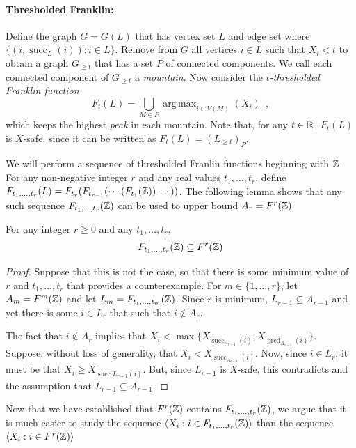 \documentclass{patmorin}
\DeclareMathOperator*{\argmax}{arg\,max}
\DeclareMathOperator{\cw}{succ}
\DeclareMathOperator{\ccw}{pred}
\begin{document}
\paragraph{Thresholded Franklin:}
Define the graph $G=G(L)$ that has vertex set $L$ and edge set where
$\{(i,\cw_L(i)): i\in L\}$. Remove from $G$ all vertices $i\in L$
such that $X_i < t$ to obtain a graph $G_{\ge t}$ that has a set $P$
of connected components.  We call each connected component of $G_{\ge
t}$ a \emph{mountain}.  Now consider the \emph{$t$-thresholded Franklin
function}
\[
    F_t(L) = \bigcup_{M\in P} \argmax_{i\in V(M)}(X_i) \enspace ,
\]
which keeps the highest \emph{peak} in each mountain.
Note that, for any $t\in\mathbb{R}$, $F_t(L)$ is $X$-safe, since it can be
written as $F_t(L) = (L_{\ge t})_P$.

We will perform a sequence of thresholded Franlin functions
beginning with $\mathbb{Z}$.  For any non-negative integer $r$ and any
real values $t_1,\ldots,t_r$, define $F_{t_1,\ldots,t_r}(L) =
F_{t_r}(F_{t_{r-1}}(\cdots(F_{t_1}(\mathbb{Z}))\cdots ))$.  The following lemma
shows that any such sequence $F_{t_1,\ldots,t_r}(\mathbb{Z})$ can be used to upper
bound $A_r=F^r(\mathbb{Z})$

\begin{lem}
   For any integer $r\ge 0$ and any $t_1,\ldots,t_r$,
   \[  F_{t_1,\ldots,t_r}(\mathbb{Z}) \subseteq F^{r}(\mathbb{Z})   \]
\end{lem}

\begin{proof}
   Suppose that this is not the case, so that there is some
   minimum value of $r$ and $t_1,\ldots,t_r$ that provides a
   counterexample.  For $m\in\{1,\ldots,r\}$, let $A_m=F^{m}(\mathbb{Z})$ and let
   $L_m=F_{t_1,\ldots,t_m}(\mathbb{Z})$.  Since $r$ is minimum, $L_{r-1}\subseteq
   A_{r-1}$ and yet there is some $i\in L_r$ that such that $i\not\in
   A_r$.

   The fact that $i\not\in A_r$ implies that $X_i
   < \max\{X_{\cw_{A_{r-1}}(i)},X_{\ccw_{A_{r-1}}(i)}\}$.
   Suppose, without loss of generality, that $X_i < X_{\cw_{A_{r-1}}(i)}$.
   Now, since $i\in L_r$, it must be that $X_i
   \ge X_{\cw{L_{r-1}}(i)}$.  But, since $L_{r-1}$ is
   $X$-safe, this contradicts  and the assumption that
   $L_{r-1}\subseteq A_{r-1}$.
\end{proof}

Now that we have established that $F^r(\mathbb{Z})$ contains $F_{t_1,\ldots,t_r
}(\mathbb{Z})$, we argue that it is much easier to study the sequence $\langle
X_i:i\in F_{t_1,\ldots,t_r}(\mathbb{Z})\rangle$ than the sequence $\langle X_i:
i\in F^r(\mathbb{Z})\rangle$.
\end{document}
